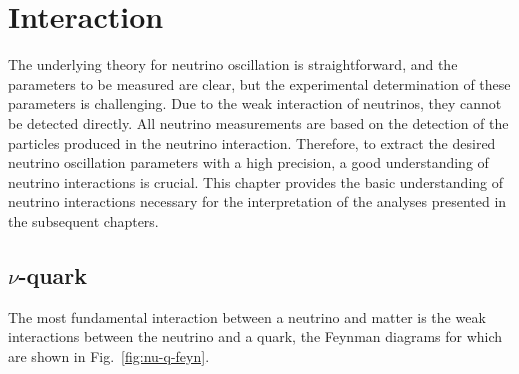 \section{Interaction}
\label{sec:interaction}
The underlying theory for neutrino oscillation is straightforward, and the parameters to be measured are clear, but the experimental determination of these parameters is challenging.
Due to the weak interaction of neutrinos, they cannot be detected directly.
All neutrino measurements are based on the detection of the particles produced in the neutrino interaction.
Therefore, to extract the desired neutrino oscillation parameters with a high precision, a good understanding of neutrino interactions is crucial.
This chapter provides the basic understanding of neutrino interactions necessary for the interpretation of the analyses presented in the subsequent chapters.

\subsection{$\nu$-quark}
The most fundamental interaction between a neutrino and matter is the weak interactions between the neutrino and a quark, the Feynman diagrams for which are shown in Fig.~\ref{fig:nu-q-feyn}.

